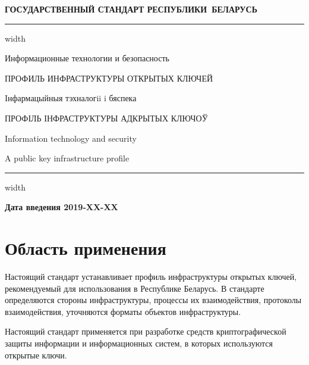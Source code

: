 \begin{center}
{\bfseries
ГОСУДАРСТВЕННЫЙ СТАНДАРТ РЕСПУБЛИКИ~БЕЛАРУСЬ
\vskip 2pt
\hrule width\textwidth

\vskip 9pt

Информационные технологии и безопасность

ПРОФИЛЬ ИНФРАСТРУКТУРЫ ОТКРЫТЫХ КЛЮЧЕЙ

\vskip 9pt

Iнфармацыйныя тэхналогii i бяспека

ПРОФІЛЬ ІНФРАСТРУКТУРЫ АДКРЫТЫХ КЛЮЧОЎ
} %

\vskip 9pt

Information technology and security

A public key infrastructure profile

\vskip 4pt                
\hrule width \textwidth
\end{center}

\mbox{}\hfill{\bfseries Дата введения 2019-XX-XX}

\chapter{Область применения}

Настоящий стандарт устанавливает профиль инфраструктуры открытых ключей,
рекомендуемый для использования в Республике Беларусь.
%
В стандарте определяются стороны инфраструктуры, процессы их взаимодействия,
протоколы взаимодействия, уточняются форматы объектов инфраструктуры.

Настоящий стандарт применяется при разработке средств 
криптографической защиты информации и информационных систем, в которых 
используются открытые ключи.  



